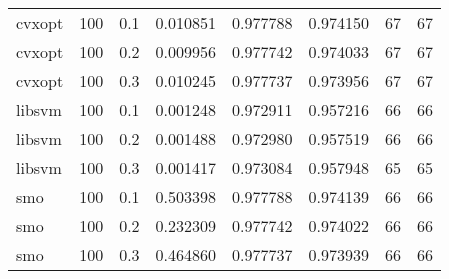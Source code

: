 \begin{tabular}{lllrrrrr}
   cvxopt & 100 &     0.1 &  0.010851 &  0.977788 & 0.974150 &           67 &          67 \\
   cvxopt & 100 &     0.2 &  0.009956 &  0.977742 & 0.974033 &           67 &          67 \\
   cvxopt & 100 &     0.3 &  0.010245 &  0.977737 & 0.973956 &           67 &          67 \\
   libsvm & 100 &     0.1 &  0.001248 &  0.972911 & 0.957216 &           66 &          66 \\
   libsvm & 100 &     0.2 &  0.001488 &  0.972980 & 0.957519 &           66 &          66 \\
   libsvm & 100 &     0.3 &  0.001417 &  0.973084 & 0.957948 &           65 &          65 \\
      smo & 100 &     0.1 &  0.503398 &  0.977788 & 0.974139 &           66 &          66 \\
      smo & 100 &     0.2 &  0.232309 &  0.977742 & 0.974022 &           66 &          66 \\
      smo & 100 &     0.3 &  0.464860 &  0.977737 & 0.973939 &           66 &          66 \\
\bottomrule
\end{tabular}
